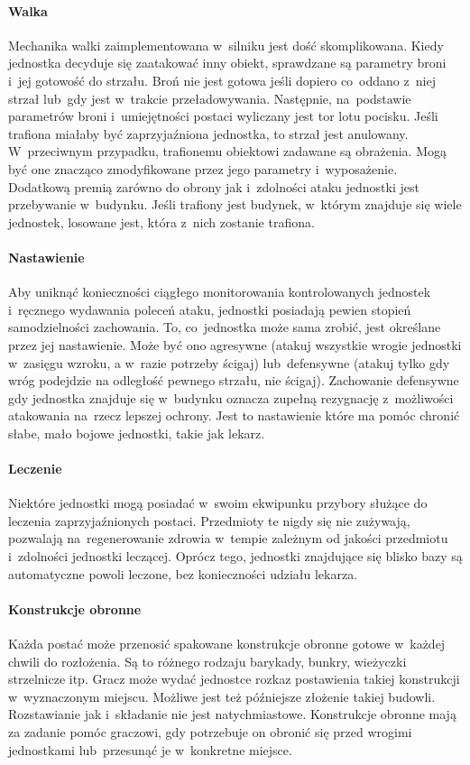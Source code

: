 \documentclass[licencjacka]{pracamgr}
\begin{document}
      \paragraph{Walka}
        Mechanika walki zaimplementowana w~silniku jest dość skomplikowana. Kiedy jednostka decyduje się zaatakować inny
        obiekt,	sprawdzane są parametry broni i~jej gotowość do strzału. Broń nie jest gotowa jeśli dopiero co~oddano
        z~niej strzał lub~gdy jest w~trakcie przeładowywania. Następnie, na~podstawie parametrów broni i~umiejętności
        postaci wyliczany jest tor lotu pocisku. Jeśli trafiona miałaby być zaprzyjaźniona jednostka, to strzał jest
        anulowany. W~przeciwnym przypadku, trafionemu obiektowi zadawane są obrażenia. Mogą być one znacząco zmodyfikowane
        przez jego parametry i~wyposażenie. Dodatkową premią zarówno do obrony jak i~zdolności	ataku jednostki jest
        przebywanie w~budynku. Jeśli trafiony jest budynek, w~którym znajduje się wiele jednostek, losowane jest, która   
        z~nich	zostanie trafiona.
      \paragraph{Nastawienie}
        Aby uniknąć konieczności ciągłego monitorowania kontrolowanych jednostek i~ręcznego wydawania poleceń ataku,
        jednostki posiadają pewien stopień samodzielności zachowania. To, co~jednostka może sama zrobić, jest określane
        przez jej nastawienie. Może być ono agresywne (atakuj wszystkie wrogie jednostki w~zasięgu wzroku, a w~razie
        potrzeby ścigaj) lub~defensywne (atakuj tylko gdy wróg podejdzie na odległość pewnego strzału, nie ścigaj).
        Zachowanie defensywne gdy jednostka znajduje się w~budynku oznacza zupełną rezygnację	z~możliwości atakowania
        na~rzecz lepszej ochrony. Jest to nastawienie które ma pomóc chronić słabe, mało bojowe jednostki, takie jak
        lekarz.
      \paragraph{Leczenie}
        Niektóre jednostki mogą posiadać w~swoim ekwipunku przybory służące do leczenia zaprzyjaźnionych postaci.
        Przedmioty te nigdy się nie zużywają, pozwalają na~regenerowanie zdrowia w~tempie zależnym od jakości przedmiotu
        i~zdolności jednostki leczącej. Oprócz tego, jednostki znajdujące się blisko bazy są automatyczne powoli leczone,
        bez konieczności udziału lekarza.
      \paragraph{Konstrukcje obronne}
        Każda postać może przenosić spakowane konstrukcje obronne gotowe w~każdej chwili do rozłożenia. Są to różnego
        rodzaju barykady, bunkry, wieżyczki strzelnicze itp. Gracz może wydać jednostce rozkaz postawienia takiej
        konstrukcji w~wyznaczonym miejscu. Możliwe jest też późniejsze złożenie takiej budowli. Rozstawianie jak
        i~składanie nie jest natychmiastowe. Konstrukcje obronne mają za zadanie pomóc graczowi,	gdy potrzebuje on obronić
        się przed wrogimi jednostkami lub~przesunąć je w~konkretne miejsce.
\end{document}
